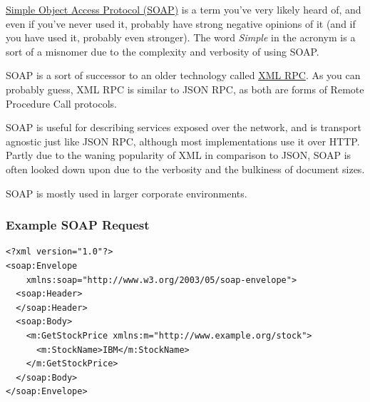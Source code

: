\documentclass{book}
\begin{document}
\href{https://en.wikipedia.org/wiki/SOAP}{Simple Object Access Protocol (SOAP)} is a term you've very likely heard of, and even if you've never used it, probably have strong negative opinions of it (and if you have used it, probably even stronger). The word \emph{Simple} in the acronym is a sort of a misnomer due to the complexity and verbosity of using SOAP.

SOAP is a sort of successor to an older technology called \href{https://en.wikipedia.org/wiki/XML-RPC}{XML RPC}. As you can probably guess, XML RPC is similar to JSON RPC, as both are forms of Remote Procedure Call protocols.

SOAP is useful for describing services exposed over the network, and is transport agnostic just like JSON RPC, although most implementations use it over HTTP. Partly due to the waning popularity of XML in comparison to JSON, SOAP is often looked down upon due to the verbosity and the bulkiness of document sizes.

SOAP is mostly used in larger corporate environments.

\subsubsection{Example SOAP Request}

\begin{verbatim}
<?xml version="1.0"?>
<soap:Envelope
    xmlns:soap="http://www.w3.org/2003/05/soap-envelope">
  <soap:Header>
  </soap:Header>
  <soap:Body>
    <m:GetStockPrice xmlns:m="http://www.example.org/stock">
      <m:StockName>IBM</m:StockName>
    </m:GetStockPrice>
  </soap:Body>
</soap:Envelope>
\end{verbatim}
\end{document}
